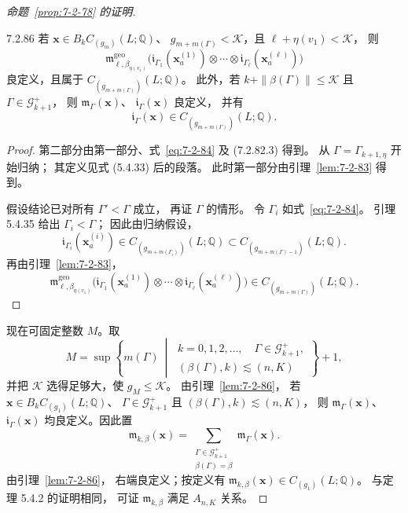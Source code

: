 \begin{proof}[命题~\ref{prop:7-2-78} 的证明]
\begin{lemma}{7.2.86}\label{lem:7-2-86}
若
$\mathbf x\in B_kC_{(g_m)}(L;\mathbb Q)$、
$g_{m+m(\Gamma)}<\mathcal K$，且
$\ell+\eta(v_1)<\mathcal K$，
则
\[
\mathfrak m^{\mathrm{geo}}_{\ell,\beta_{\eta(v_1)}}
\bigl(\mathfrak i_{\Gamma_1}(\mathbf x_a^{(1)})
\otimes\cdots\otimes
\mathfrak i_{\Gamma_\ell}(\mathbf x_a^{(\ell)})\bigr)
\]
良定义，且属于
$C_{(g_{m+m(\Gamma)})}(L;\mathbb Q)$。
此外，若 $k+\|\beta(\Gamma)\|\le\mathcal K$
且 $\Gamma\in\mathcal G^+_{k+1}$，
则 $\mathfrak m_\Gamma(\mathbf x)$、
$\mathfrak i_\Gamma(\mathbf x)$ 良定义，
并有
\[
\mathfrak i_\Gamma(\mathbf x)
\in C_{(g_{m+m(\Gamma)})}(L;\mathbb Q).
\]
\end{lemma}

\begin{proof}
第二部分由第一部分、式~\eqref{eq:7-2-84}
及 (7.2.82.3) 得到。
从 $\Gamma=\Gamma_{k+1,\eta}$ 开始归纳；
其定义见式 (5.4.33) 后的段落。
此时第一部分由引理~\ref{lem:7-2-83} 得到。

假设结论已对所有 $\Gamma'<\Gamma$ 成立，
再证 $\Gamma$ 的情形。
令 $\Gamma_i$ 如式~\eqref{eq:7-2-84}。
引理 5.4.35 给出 $\Gamma_i<\Gamma$；
因此由归纳假设，
\[
\mathfrak i_{\Gamma_i}
(\mathbf x_a^{(i)})
\in C_{(g_{m+m(\Gamma_i)})}(L;\mathbb Q)
\subset C_{(g_{m+m(\Gamma)-1})}(L;\mathbb Q).
\]
再由引理~\ref{lem:7-2-83}，
\[
\mathfrak m^{\mathrm{geo}}_{\ell,\beta_{\eta(v_1)}}
\bigl(\mathfrak i_{\Gamma_1}(\mathbf x_a^{(1)})
\otimes\cdots\otimes
\mathfrak i_{\Gamma_\ell}(\mathbf x_a^{(\ell)})\bigr)
\in C_{(g_{m+m(\Gamma)})}(L;\mathbb Q).
\]
\end{proof}

现在可固定整数 $M$。取
\[
M=\sup\left\{m(\Gamma)\ \middle|\
\begin{gathered}
k=0,1,2,\ldots,\quad
\Gamma\in\mathcal G^+_{k+1},\\[-2pt]
(\beta(\Gamma),k)\lesssim(n,K)
\end{gathered}\right\}+1,
\]
并把 $\mathcal K$ 选得足够大，使
$g_M\le\mathcal K$。
由引理~\ref{lem:7-2-86}，
若
$\mathbf x\in B_kC_{(g_1)}(L;\mathbb Q)$、
$\Gamma\in\mathcal G^+_{k+1}$ 且
$(\beta(\Gamma),k)\lesssim(n,K)$，
则 $\mathfrak m_\Gamma(\mathbf x)$、
$\mathfrak i_\Gamma(\mathbf x)$
均良定义。因此置
\begin{equation}
\mathfrak m_{k,\beta}(\mathbf x)
=\sum_{\substack{\Gamma\in\mathcal G^+_{k+1}\\
                  \beta(\Gamma)=\beta}}
\mathfrak m_\Gamma(\mathbf x).
\tag{7.2.87}\label{eq:7-2-87}
\end{equation}
由引理~\ref{lem:7-2-86}，
右端良定义；按定义有
$\mathfrak m_{k,\beta}(\mathbf x)
\in C_{(g_1)}(L;\mathbb Q)$。
与定理 5.4.2 的证明相同，
可证 $\mathfrak m_{k,\beta}$ 满足
$A_{n,K}$ 关系。


\end{proof}
